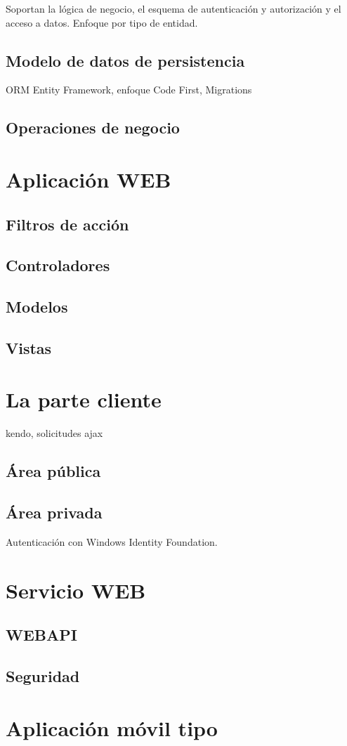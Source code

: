 Soportan la lógica de negocio, el esquema de autenticación y autorización y el acceso a datos. Enfoque por tipo de entidad.

\subsection{Modelo de datos de persistencia}

ORM Entity Framework, enfoque Code First, Migrations

\subsection{Operaciones de negocio}

\section{Aplicación WEB}

\subsection{Filtros de acción}

\subsection{Controladores}

\subsection{Modelos}

\subsection{Vistas}


\section{La parte cliente}

kendo, solicitudes ajax

\subsection{Área pública}

\subsection{Área privada}


Autenticación con Windows Identity Foundation.

\section{Servicio WEB}

\subsection{WEBAPI}

\subsection{Seguridad}

\section{Aplicación móvil tipo}